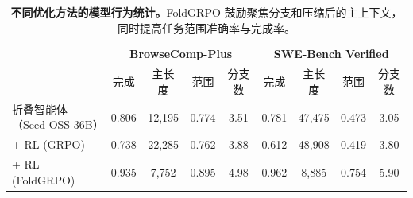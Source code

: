 \begin{table}[t!]
\centering\scriptsize
\setlength{\tabcolsep}{3pt}
\begin{tabular}{l|cccc|cccc}
\toprule
& \multicolumn{4}{c|}{\textbf{BrowseComp-Plus}} & \multicolumn{4}{c}{\textbf{SWE-Bench Verified}} \\
 & 完成 & 主长度 & 范围 & 分支数 & 完成 & 主长度 & 范围 & 分支数 \\
\midrule
折叠智能体（Seed-OSS-36B） & 0.806 & 12,195 & 0.774 & 3.51 & 0.781 & 47,475 & 0.473  & 3.05\\
\quad + RL (GRPO) & 0.738 & 22,285 & 0.762 & 3.88 & 0.612 & 48,908 & 0.419 & 3.80\\
\quad + RL (FoldGRPO) & 0.935 & 7,752 & 0.895 & 4.98 & 0.962 & 8,885 & 0.754 & 5.90\\
\bottomrule
\end{tabular}
\vspace{-0.5em}
\caption{\textbf{不同优化方法的模型行为统计。}FoldGRPO 鼓励聚焦分支和压缩后的主上下文，同时提高任务范围准确率与完成率。}\label{tab:action}
\end{table}
